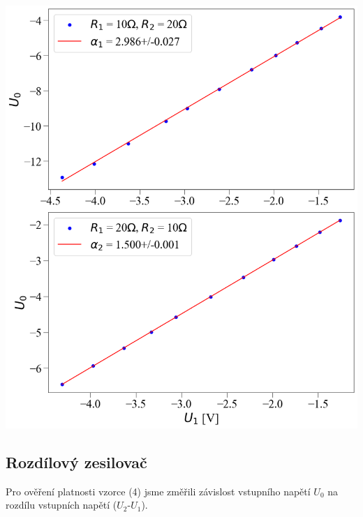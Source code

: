\documentclass[a4paper,11pt]{article}
\begin{document}
\begin{minipage}[t]{0.5\textwidth}
                \vspace{10pt}           
                \par \centering
                \includegraphics[scale=0.32]{non_inv}
                \captionsetup{justification=centering, font=footnotesize}
                \label{fig:non_inv}
                \vspace{10pt}
                \raggedright
            
            \subsection{Rozdílový zesilovač}
                Pro ověření platnosti vzorce (4) jsme změřili závislost vstupního napětí $U_0$ na rozdílu vstupních napětí ($U_2$-$U_1$).

    \end{minipage}
    \hspace{10pt}  
\end{document}

